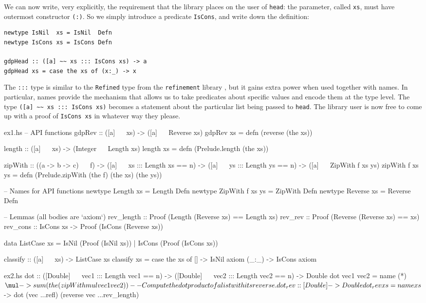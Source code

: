 \documentclass[format=sigplan, review=false, screen=true]{acmart}
\begin{document}
We can now write, very explicitly, the requirement that the library places on the user
of \texttt{head}: the parameter, called \texttt{xs}, must have outermost constructor
\texttt{(:)}. So we simply introduce a predicate \texttt{IsCons}, and write down the definition:
\begin{verbatim}
newtype IsNil  xs = IsNil  Defn
newtype IsCons xs = IsCons Defn

gdpHead :: ([a] ~~ xs ::: IsCons xs) -> a
gdpHead xs = case the xs of (x:_) -> x
\end{verbatim}
The \texttt{:::} type is similar to the \texttt{Refined} type from the \texttt{refinement} library \cite{refined},
but it gains extra power when used together with names.
In particular, names provide the mechanism that allows us to take predicates about specific values and
encode them at the type level.
The type \verb|([a] ~~ xs ::: IsCons xs)| becomes a statement about the particular list being passed to \texttt{head}.
The library user is now free to come up with a proof of \texttt{IsCons xs} in whatever way they please.


\begin{filecontents*}{ex1.hs}
-- API functions
gdpRev :: ([a] ~~ xs) -> ([a] ~~ Reverse xs)
gdpRev xs = defn (reverse (the xs))

length :: ([a] ~~ xs) -> (Integer ~~ Length xs)
length xs = defn (Prelude.length (the xs))

zipWith :: ((a -> b -> c) ~~ f)
         -> ([a] ~~ xs ::: Length xs == n)
         -> ([a] ~~ ys ::: Length ys == n)
         -> ([a] ~~ ZipWith f xs ys)
zipWith f xs ys =
  defn (Prelude.zipWith (the f) (the xs) (the ys))

-- Names for API functions
newtype Length  xs      = Length  Defn
newtype ZipWith f xs ys = ZipWith Defn
newtype Reverse xs      = Reverse Defn

-- Lemmas (all bodies are `axiom`)
rev_length :: Proof (Length (Reverse xs) == Length xs)
rev_rev    :: Proof (Reverse (Reverse xs) == xs)
rev_cons   :: IsCons xs -> Proof (IsCons (Reverse xs))

data ListCase xs = IsNil  (Proof (IsNil  xs))
                 | IsCons (Proof (IsCons xs)) 

classify :: ([a] ~~ xs) -> ListCase xs
classify xs = case the xs of
  []    -> IsNil  axiom
  (_:_) -> IsCons axiom
\end{filecontents*}

\begin{filecontents*}{ex2.hs}
dot :: ([Double] ~~ vec1 ::: Length vec1 == n)
    -> ([Double] ~~ vec2 ::: Length vec2 == n)
    -> Double
dot vec1 vec2 = name (*) $ \mul ->
  sum (the (zipWith mul vec1 vec2))

-- Compute the dot product of a list with its reverse.
dot_rev :: [Double] -> Double
dot_rev xs = name xs $ \vec ->
  dot (vec ...refl) (reverse vec ...rev_length)
\end{filecontents*}
\end{document}
